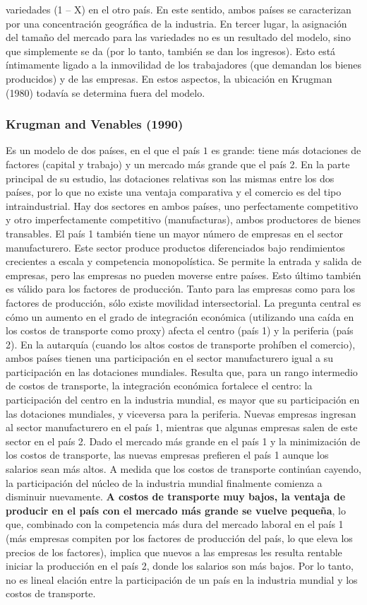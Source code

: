 variedades (1 – X) en el otro país. En este sentido, ambos países se caracterizan por una concentración geográfica de la industria. En tercer lugar, la asignación del tamaño del mercado para las variedades no es un resultado del modelo, sino que simplemente se da (por lo tanto, también se dan los ingresos). Esto está íntimamente ligado a la inmovilidad de los trabajadores (que demandan los bienes producidos) y de las empresas. En estos aspectos, la ubicación en Krugman (1980) todavía se determina fuera del modelo.

\subsubsection{Krugman and Venables (1990)} 
Es un modelo de dos países, en el que el país $1$ es grande: tiene más dotaciones de factores (capital y trabajo) y un mercado más grande que el país 2. En la parte principal de su estudio, las dotaciones relativas son las mismas entre los dos países, por lo que no existe una ventaja comparativa y el comercio es del tipo intraindustrial. Hay dos sectores en ambos países, uno perfectamente competitivo y otro imperfectamente competitivo (manufacturas), ambos productores de bienes transables. El país 1 también tiene un mayor número de empresas en el sector manufacturero. Este sector produce productos diferenciados bajo rendimientos crecientes a escala y competencia monopolística. Se permite la entrada y salida de empresas, pero las empresas no pueden moverse entre países. Esto último también es válido para los factores de producción. Tanto para las empresas como para los factores de producción, sólo existe movilidad intersectorial. La pregunta central es cómo un aumento en el grado de integración económica (utilizando una caída en los costos de transporte como proxy) afecta el centro (país 1) y la periferia (país 2). En la autarquía (cuando los altos costos de transporte prohíben el comercio), ambos países tienen una participación en el sector manufacturero igual a su participación en las dotaciones mundiales. Resulta que, para un rango intermedio de costos de transporte, la integración económica fortalece el centro: la participación del centro en la industria mundial, es mayor que su participación en las dotaciones mundiales, y viceversa para la periferia. Nuevas empresas ingresan al sector manufacturero en el país 1, mientras que algunas empresas salen de este sector en el país 2. Dado el mercado más grande en el país 1 y la minimización de los costos de transporte, las nuevas empresas prefieren el país 1 aunque los salarios sean más altos. A medida que los costos de transporte continúan cayendo, la participación del núcleo de la industria mundial finalmente comienza a disminuir nuevamente. \textbf{A costos de transporte muy bajos, la ventaja de producir en el país con el mercado más grande se vuelve pequeña}, lo que, combinado con la competencia más dura del mercado laboral en el país 1 (más empresas compiten por los factores de producción del país, lo que eleva los precios de los factores), implica que nuevos a las empresas les resulta rentable iniciar la producción en el país 2, donde los salarios son más bajos.  Por lo tanto, no es lineal elación entre la participación de un país en la industria mundial y los costos de transporte.\\
